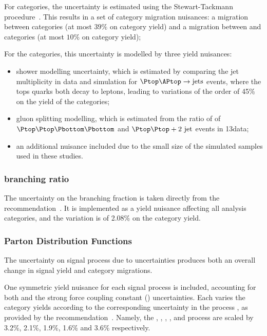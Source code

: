For \VBFTag categories, the uncertainty is estimated using the Stewart-Tackmann procedure~\cite{StewartTackmann}. This results in a set of category migration nuisances: a migration between \VBFTag categories (at most $39\%$ on category yield) and a migration between \Untagged and \VBFTag categories (at most $10\%$ on category yield); %

For the \TTHTag categories, this uncertainty is modelled by three yield nuisances:
\begin{itemize}
\item shower modelling uncertainty, which is estimated by comparing the jet multiplicity in data and simulation for $\Ptop \APtop \rightarrow \text{jets}$ events, where the tops quarks both decay to leptons, leading to variations of the order of 45\% on the yield of the \TTHTag categories; 
\item gluon splitting modelling, which is estimated from the ratio of \crosssection\s of $\Ptop \Ptop \Pbottom \Pbottom$ and $\Ptop \Ptop +2\text{ jet}$ events in 13\TeV data;
\item an additional nuisance included due to the small size of the simulated samples used in these studies.
\end{itemize}

\subsubsection{\Hgg branching ratio}
The uncertainty on the \Hgg branching fraction is taken directly from the \LHCHXSWG recommendation~\cite{LHCHXSWGYR4}. It is implemented as a yield nuisance affecting all analysis categories, and the variation is of 2.08\% on the category yield.

\subsubsection{Parton Distribution Functions}

The uncertainty on signal process \crosssection\s due to \PDF uncertainties produces both an overall change in signal yield and category migrations.

One symmetric yield nuisance for each signal process is included, accounting for both \PDF and the strong force coupling constant (\alphaS) uncertainties. Each varies the category yields according to the corresponding uncertainty in the process \crosssection, as provided by the \LHCHXSWG recommendation~\cite{LHCHXSWGYR4}. Namely, the \ggH, \VBF, \WH, \ZH, and \ttH process \crosssection\s are scaled by 3.2\%, 2.1\%, 1.9\%, 1.6\% and 3.6\% respectively. 

